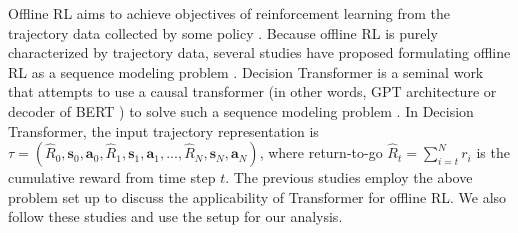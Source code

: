 Offline RL aims to achieve objectives of reinforcement learning from the trajectory data collected by some policy \cite{levine2020offline}. Because offline RL is purely characterized by trajectory data, several studies have proposed formulating offline RL as a sequence modeling problem \cite{janner2021offline,chen2021decision}. Decision Transformer is a seminal work that attempts to use a causal transformer (in other words, GPT architecture or decoder of BERT \cite{devlin2018bert}) to solve such a sequence modeling problem \cite{chen2021decision}. In Decision Transformer, the input trajectory representation is $\tau = (\hat{R}_0,  \bm{s}_0, \bm{a}_0, \hat{R}_1, \bm{s}_1, \bm{a}_1, ..., \hat{R}_N,  \bm{s}_N, \bm{a}_N)$, where return-to-go $\hat{R}_t = \sum_{i = t}^{N} r_i$ is the cumulative reward from time step $t$. The previous studies \cite{reid2022can,chen2021decision} employ the above problem set up to discuss the applicability of Transformer for offline RL. We also follow these studies and use the setup for our analysis.